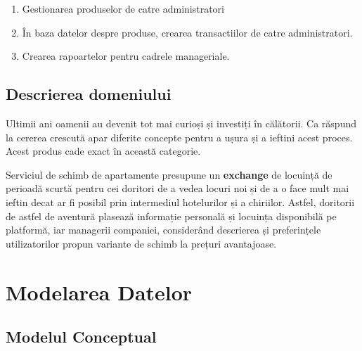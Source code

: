 \documentclass[12pt. a4paper]{report}
\begin{document}
\begin{enumerate}
	\item Gestionarea produselor de catre administratori
	
	\item În baza datelor despre produse, crearea transactiilor de catre administratori.
	
	\item Crearea rapoartelor pentru cadrele manageriale.
\end{enumerate}

\section{Descrierea domeniului}
Ultimii ani oamenii au devenit tot mai curioși și investiți în călătorii. Ca răspund la cererea crescută apar diferite concepte pentru a ușura și a ieftini acest proces. Acest produs cade exact în această categorie.

Serviciul de schimb de apartamente presupune un \textbf{exchange} de locuință de perioadă scurtă pentru cei doritori de a vedea locuri noi și de a o face mult mai ieftin decat ar fi posibil prin intermediul hotelurilor și a chiriilor. Astfel, doritorii de astfel de aventură plasează informație personală și locuința disponibilă pe platformă, iar managerii companiei, considerând descrierea și preferințele utilizatorilor propun variante de schimb la prețuri avantajoase.

\chapter{Modelarea Datelor}

\section{Modelul Conceptual}
\end{document}
